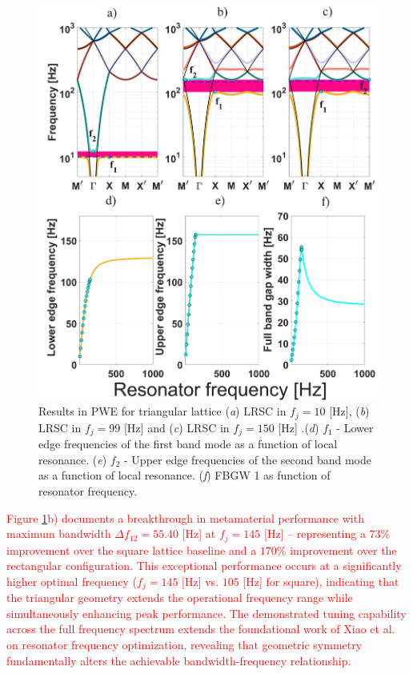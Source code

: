 \documentclass[review,numbers,sort&compress]{elsarticle}
\begin{document}
\newpage
\begin{figure}[htb]
	\centering
	\includegraphics[width=.8\textwidth]{2_3_disp_frf_trian.pdf}
	\caption{Results in PWE for triangular lattice (\textit{a}) LRSC in $f_j=10$ [Hz], (\textit{b}) LRSC in $f_j=99$ [Hz] and (\textit{c}) LRSC in $f_j=150$ [Hz] .(\textit{d}) $f_1$ - Lower edge frequencies of the first band mode as a function of local resonance. (\textit{e}) $f_2$ -  Upper edge frequencies of the second band mode as a function of local resonance. (\textit{f}) FBGW 1 as function of resonator frequency.}
	\label{pwe_disp_trian_all_res}
\end{figure}

\textcolor{red}{Figure \ref{pwe_disp_trian_all_res}b) documents a breakthrough in metamaterial performance with maximum bandwidth $\Delta f_{12} = 55.40$ [Hz] at $f_j = 145$ [Hz] – representing a $73\%$ improvement over the square lattice baseline and a $170\%$ improvement over the rectangular configuration. This exceptional performance occurs at a significantly higher optimal frequency ($f_j = 145$ [Hz] vs. $105$ [Hz] for square), indicating that the triangular geometry extends the operational frequency range while simultaneously enhancing peak performance. The demonstrated tuning capability across the full frequency spectrum extends the foundational work of Xiao et al.~\cite{Xiao_2012} on resonator frequency optimization, revealing that geometric symmetry fundamentally alters the achievable bandwidth-frequency relationship.}
\end{document}
